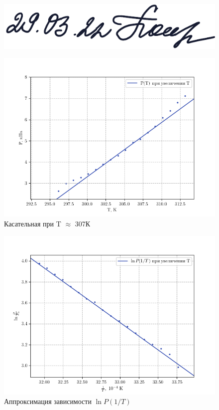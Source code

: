 \documentclass[12pt,a4paper]{article}
\begin{document}
\begin{enumerate}
    \begin{figure}[ht]
        \begin{flushright}
            \includegraphics[scale=0.9]{sign.png}
        \end{flushright}     
    \end{figure}

    \begin{figure}[ht]
        \centering
        \includegraphics[scale=0.9]{PT2.png}
        \caption{Касательная при T $\approx$ 307К}
    \end{figure}

    \begin{figure}[htp]
        \centering
        \includegraphics[scale=0.9]{lnpt2.png}
        \caption{Аппроксимация зависимости $\ln{P}(1/T)$}
    \end{figure}

   
\end{enumerate}
\end{document}
